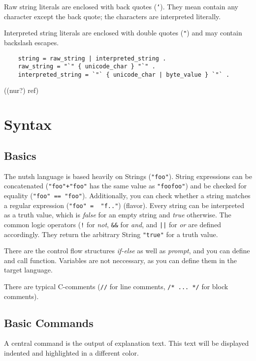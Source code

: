 \documentclass[twoside,parskip]{scrreprt}
\begin{document}
Raw string literals are enclosed with back quotes (\texttt{`}). They mean contain any character except the back quote; the characters are interpreted literally.

Interpreted string literals are enclosed with double quotes (\texttt{"}) and may contain backslash escapes.

\begin{lstlisting}
    string = raw_string | interpreted_string .
    raw_string = "`" { unicode_char } "`" .
    interpreted_string = `"` { unicode_char | byte_value } `"` .
\end{lstlisting}

((nur?) ref)

\section{Syntax}

\subsection{Basics}

The nutsh language is based heavily on Strings (\texttt{"foo"}). String expressions can be concatenated (\texttt{"foo"+"foo"} has the same value as \texttt{"foofoo"}) and be checked for equality (\texttt{"foo" == "foo"}). Additionally, you can check whether a string matches a regular expression (\texttt{"foo" =~ "f.."}) (flavor). Every string can be interpreted as a truth value, which is \emph{false} for an empty string and \emph{true} otherwise. The common logic operators (\texttt{!} for \emph{not}, \texttt{\&\&} for \emph{and}, and \texttt{||} for \emph{or} are defined accordingly. They return the arbitrary String \texttt{"true"} for a truth value.

There are the control flow structures \emph{if-else} as well as \emph{prompt}, and you can define and call function. Variables are not neccessary, as you can define them in the target language.

There are typical C-comments (\texttt{//} for line comments, \texttt{/* ... */} for block comments).

\subsection{Basic Commands}

A central command is the output of explanation text. This text will be displayed indented and highlighted in a different color.
\end{document}
